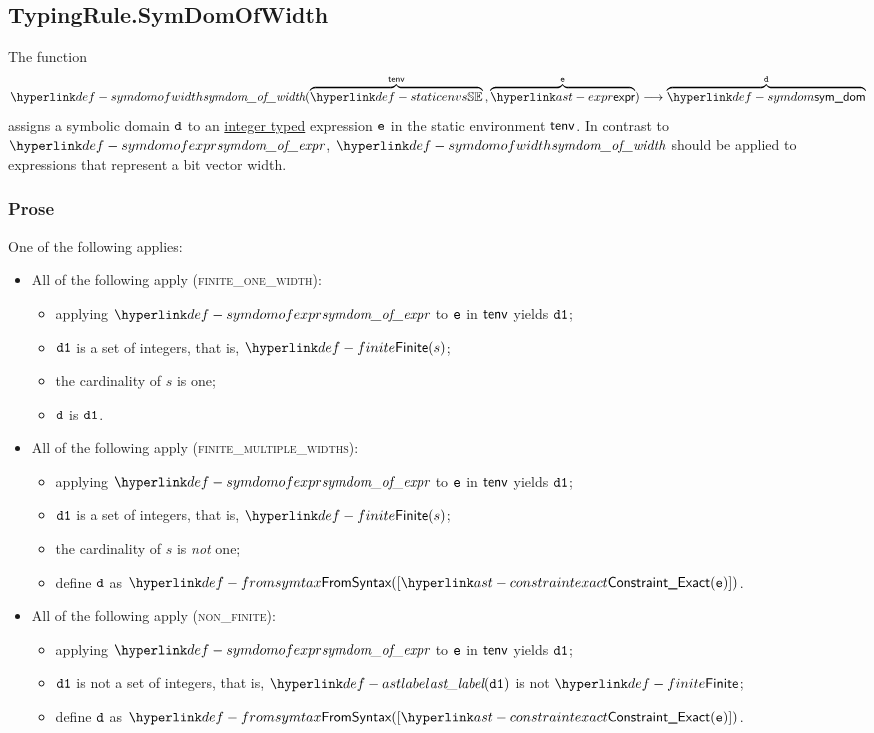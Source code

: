\subsection{TypingRule.SymDomOfWidth \label{sec:TypingRule.SymDomOfWidth}}
\hypertarget{def-symdomofwidth}{}
The function
\[
\symdomofwidth(
  \overname{\staticenvs}{\tenv} \aslsep
  \overname{\expr}{\ve}
) \aslto
\overname{\symdom}{\vd}
\]
assigns a symbolic domain $\texttt{d}$ to an \underline{integer typed} expression $\texttt{e}$ in the static environment $\textsf{tenv}$.
In contrast to $\symdomofexpr$, $\symdomofwidth$ should be applied to expressions that represent a bit vector width.

\subsubsection{Prose}
One of the following applies:
\begin{itemize}
  \item All of the following apply (\textsc{finite\_one\_width}):
  \begin{itemize}
    \item applying $\symdomofexpr$ to $\texttt{e}$ in $\textsf{tenv}$ yields $\texttt{d1}$;
    \item $\texttt{d1}$ is a set of integers, that is, $\Finite(s)$;
    \item the cardinality of $s$ is one;
    \item $\texttt{d}$ is $\texttt{d1}$.
  \end{itemize}

  \item All of the following apply (\textsc{finite\_multiple\_widths}):
  \begin{itemize}
    \item applying $\symdomofexpr$ to $\texttt{e}$ in $\textsf{tenv}$ yields $\texttt{d1}$;
    \item $\texttt{d1}$ is a set of integers, that is, $\Finite(s)$;
    \item the cardinality of $s$ is \emph{not} one;
    \item define $\texttt{d}$ as $\FromSyntax([\ConstraintExact(\ve)])$.
  \end{itemize}

  \item All of the following apply (\textsc{non\_finite}):
  \begin{itemize}
    \item applying $\symdomofexpr$ to $\texttt{e}$ in $\textsf{tenv}$ yields $\texttt{d1}$;
    \item $\texttt{d1}$ is not a set of integers, that is, $\astlabel(\vdone)$ is not $\Finite$;
    \item define $\texttt{d}$ as $\FromSyntax([\ConstraintExact(\ve)])$.
  \end{itemize}
\end{itemize}

